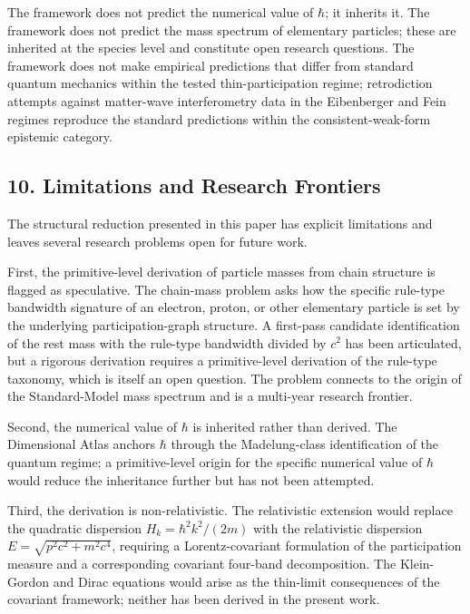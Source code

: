 \documentclass[
  11pt,
]{article}
\begin{document}
The framework does not predict the numerical value of \(\hbar\); it
inherits it. The framework does not predict the mass spectrum of
elementary particles; these are inherited at the species level and
constitute open research questions. The framework does not make
empirical predictions that differ from standard quantum mechanics within
the tested thin-participation regime; retrodiction attempts against
matter-wave interferometry data in the Eibenberger and Fein regimes
reproduce the standard predictions within the consistent-weak-form
epistemic category.

\subsection{10. Limitations and Research
Frontiers}\label{limitations-and-research-frontiers}

The structural reduction presented in this paper has explicit
limitations and leaves several research problems open for future work.

First, the primitive-level derivation of particle masses from chain
structure is flagged as speculative. The chain-mass problem asks how the
specific rule-type bandwidth signature of an electron, proton, or other
elementary particle is set by the underlying participation-graph
structure. A first-pass candidate identification of the rest mass with
the rule-type bandwidth divided by \(c^2\) has been articulated, but a
rigorous derivation requires a primitive-level derivation of the
rule-type taxonomy, which is itself an open question. The problem
connects to the origin of the Standard-Model mass spectrum and is a
multi-year research frontier.

Second, the numerical value of \(\hbar\) is inherited rather than
derived. The Dimensional Atlas anchors \(\hbar\) through the
Madelung-class identification of the quantum regime; a primitive-level
origin for the specific numerical value of \(\hbar\) would reduce the
inheritance further but has not been attempted.

Third, the derivation is non-relativistic. The relativistic extension
would replace the quadratic dispersion \(H_k = \hbar^2 k^2 / (2m)\) with
the relativistic dispersion \(E = \sqrt{p^2 c^2 + m^2 c^4}\), requiring
a Lorentz-covariant formulation of the participation measure and a
corresponding covariant four-band decomposition. The Klein-Gordon and
Dirac equations would arise as the thin-limit consequences of the
covariant framework; neither has been derived in the present work.
\end{document}
